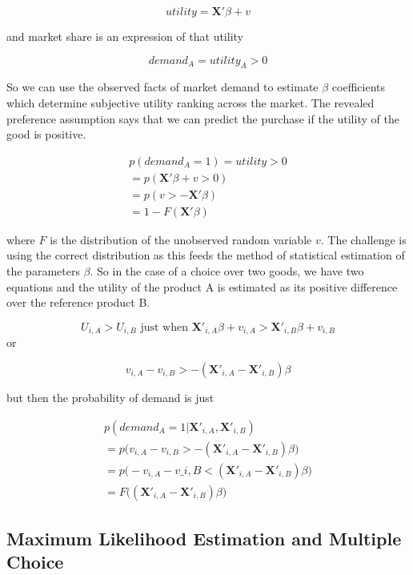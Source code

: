 \documentclass[
]{book}
\theoremstyle{definition}
\theoremstyle{definition}
\theoremstyle{definition}
\theoremstyle{remark}
\begin{document}
\[ utility = \mathbf{X'}\beta + v\]

and market share is an expression of that utility

\[ demand_A = utility_{A} > 0 \]

So we can use the observed facts of market demand to estimate \(\beta\) coefficients which determine subjective utility ranking across the market.
The revealed preference assumption says that we can predict the purchase if the utility of the good is positive.

\begin{equation}
\begin{split}
  p(demand_A = 1) = utility > 0 
\\ = p(\mathbf{X'}\beta + v > 0) 
\\ = p(v > - \mathbf{X'}\beta ) 
\\ = 1 - F(\mathbf{X'}\beta ) 
\end{split}
\end{equation}

where \(F\) is the distribution of the unobserved random variable \(v\). The challenge is using the correct distribution as this feeds the method of statistical estimation of the parameters \(\beta\). So in the case of a choice over two goods, we have two equations and the utility of the product A is estimated as its positive difference over the reference product B.

\[U_{i,A} > U_{i, B} \text{ just when } \mathbf{X'}_{i, A}\beta + v_{i,A} > \mathbf{X'}_{i, B}\beta + v_{i,B}\]
or

\[  v_{i,A} -  v_{i,B} > - (\mathbf{X'}_{i, A}  - \mathbf{X'}_{i, B})\beta \]

but then the probability of demand is just

\begin{equation}
\begin{split}
p(demand_A = 1 | \mathbf{X'}_{i, A}, \mathbf{X'}_{i, B}) 
\\ = p\Bigg( v_{i,A} -  v_{i,B} > - (\mathbf{X'}_{i, A}  - \mathbf{X'}_{i, B})\beta \Bigg) 
\\ = p\Bigg( -v_{i,A} -  v\_{i,B} < (\mathbf{X'}_{i, A}  - \mathbf{X'}_{i, B})\beta \Bigg) 
\\ = F\Bigg( (\mathbf{X'}_{i, A}  - \mathbf{X'}_{i, B})\beta \Bigg) 
\end{split}
\end{equation}

\hypertarget{maximum-likelihood-estimation-and-multiple-choice}{%
\subsection{Maximum Likelihood Estimation and Multiple Choice}\label{maximum-likelihood-estimation-and-multiple-choice}}
\end{document}
